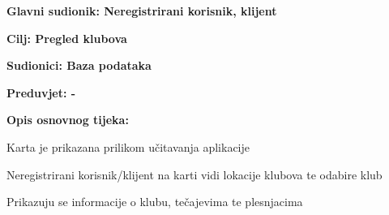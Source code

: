 					\noindent {}
					\begin{packed_item}
						
						\item \textbf{Glavni sudionik: Neregistrirani korisnik, klijent}
						\item  \textbf{Cilj: Pregled klubova} 
						\item  \textbf{Sudionici: Baza podataka}
						\item  \textbf{Preduvjet: -}
						\item  \textbf{Opis osnovnog tijeka: }
						
						\item[] \begin{packed_enum}
							
							\item Karta je prikazana prilikom učitavanja aplikacije
							\item Neregistrirani korisnik/klijent na karti vidi lokacije klubova te odabire klub
							\item Prikazuju se informacije o klubu, tečajevima te plesnjacima
							
						\end{packed_enum}
				\end{packed_item}
			
